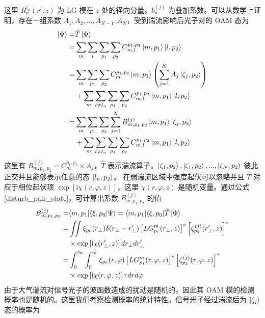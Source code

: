 \documentclass[master]{thesis-uestc}
\begin{document}
\noindent 这里 $R_{p}^{l_n}(r',z)$ 为 LG 模在 $z$ 处的径向分量。$b_n^{(j)}$ 为叠加系数。可以从数学上证明，存在一组系数 $A_1,A_2,...,A_{N-1},A_{N}$，受到湍流影响后光子对的 OAM 态为
 \begin{equation}
 \begin{split}
\ket{\Phi}=& \hat{T}\ket{\Phi}\\
          =&\sum_{m}\sum_{l}\sum_{p_1}\sum_{p_2}C_{m,l}^{p_1,p_2}\ket{m,p_1}\ket{l,p_2}\\
          =&\sum_{m}\sum_{p_1}\sum_{p_2}C_{m}^{p_1,p_2}\ket{m,p_1}\left(\sum_{j=1}^{N}A_j\ket{\zeta_j,p_2}\right)\\
          &+\sum_{m}\sum_{l\neq{l_n}}\sum_{p_1}\sum_{p_2}C_{m,l}^{p_1,p_2}\ket{m,p_1}\ket{l,p_2}\\
          =&\sum_{m}\sum_{p_1}\sum_{p_2}\sum_{j=1}^{N}B_{m,p_1,p_2}^{(j)}\ket{m,p_1}\ket{\zeta_j,p_2}\\
          &+\sum_{m}\sum_{l\neq{l_n}}\sum_{p_1}\sum_{p_2}C_{m,l}^{p_1,p_2}\ket{m,p_1}\ket{l,p_2}
 \label{disturb_pair_state}
 \end{split}
\end{equation}
\noindent 这里有 $B_{m,p_1,p_2}^{(j)}=C_{m}^{p_1,p_2}\times{A_j}$，$\hat{T}$ 表示湍流算子。$\ket{\zeta_1,p_2},\ket{\zeta_1,p_2},...,\ket{\zeta_N,p_2}$ 彼此正交并且能够表示任意的态 $\ket{l_n,p_2}$。 在弱湍流区域中强度起伏可以忽略并且 $\hat{T}$ 对应于相位起伏项 $\exp\left[\mathrm{i}\chi(r,\varphi,z)\right]$，这里 $\chi(r,\varphi,z)$ 是随机变量。通过公式 \eqref{disturb_pair_state}，可计算出系数 $B_{m,p_1,p_2}^{(j)}$ 的值
 \begin{equation}
 \begin{split}
B_{m,p_1,p_2}^{(j)}=&\langle{m,p_1}|\langle{\xi,p_0}|\Psi\rangle=\langle{m,p_1}|\langle{\xi,p_0}|\hat{T}\ket{\Phi}\\
=&\iint\xi_{p_0}(r_\perp)\delta(r_\perp-r'_\perp)\left[LG_{p_1}^{m}(r_\perp,z)\right]^\ast\left[\zeta_{p_2}^{(j)}(r'_\perp,z)\right]^\ast\\
 &\times\exp\left[\mathrm{i}\chi(r'_\perp,z)\right]dr_{\perp}dr'_\perp\\
=&\int_0^{2\pi}\int_0^{\infty}\xi_{p_0}(r,\varphi)\left[LG_{p_1}^{m}(r,\varphi,z)\right]^\ast\left[\zeta_{p_2}^{(j)}(r,\varphi,z)\right]^\ast\\
 &\times\exp\left[\mathrm{i}\chi(r,\varphi,z)\right]rdrd\varphi
 \label{amplitude}
 \end{split}
\end{equation}
\noindent 由于大气湍流对信号光子的波函数造成的扰动是随机的，因此其 OAM 模的检测概率也是随机的。这里我们考察检测概率的统计特性。信号光子经过湍流后为 $\ket{\zeta_j}$ 态的概率为
\end{document}
